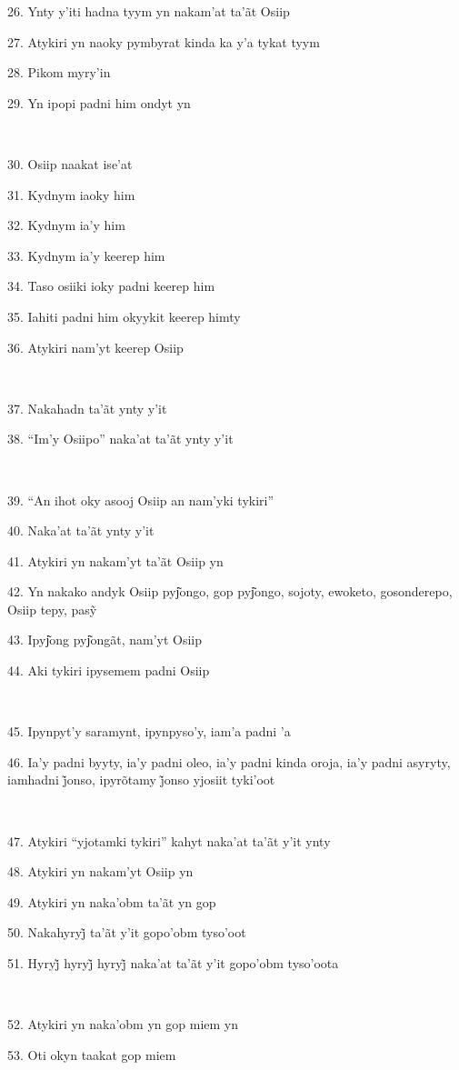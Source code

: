 26. Ynty y'iti hadna tyym yn nakam'at ta'ãt Osiip

27. Atykiri yn naoky pymbyrat kinda ka y'a tykat tyym

28. Pikom myry'in

29. Yn ipopi padni him ondyt yn

~

30. Osiip naakat ise'at

31. Kydnym iaoky him

32. Kydnym ia'y him

33. Kydnym ia'y keerep him

34. Taso osiiki ioky padni keerep him

35. Iahiti padni him okyykit keerep himty

36. Atykiri nam'yt keerep Osiip

~

37. Nakahadn ta'ãt ynty y'it

38. ``Im'y Osiipo'' naka'at ta'ãt ynty y'it

~

39. ``An ihot oky asooj Osiip an nam'yki tykiri''

40. Naka'at ta'ãt ynty y'it

41. Atykiri yn nakam'yt ta'ãt Osiip yn

42. Yn nakako andyk Osiip pyj͂ongo, gop pyj͂ongo, sojoty, ewoketo, gosonderepo, Osiip tepy, pasỹ

43. Ipyj͂ong pyj͂ongãt, nam'yt Osiip

44. Aki tykiri ipysemem padni Osiip

~

45. Ipynpyt'y saramynt, ipynpyso'y, iam'a padni 'a

46. Ia’y padni byyty, ia’y padni oleo, ia’y padni kinda oroja, ia’y padni asyryty, iamhadni j̃onso, ipyrõtamy j̃onso yjosiit tyki’oot

~

47. Atykiri ``yjotamki tykiri'' kahyt naka'at ta'ãt y'it ynty

48. Atykiri yn nakam'yt Osiip yn

49. Atykiri yn naka'obm ta'ãt yn gop

50. Nakahyryj̃ ta’ãt y’it gopo’obm tyso’oot

51. Hyryj̃ hyryj̃ hyryj̃ naka’at ta’ãt y’it gopo’obm tyso’oota

~

52. Atykiri yn naka'obm yn gop miem yn

53. Oti okyn taakat gop miem

